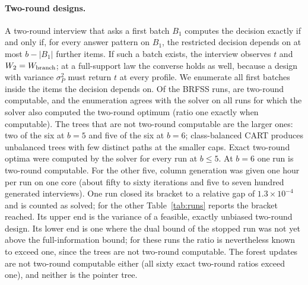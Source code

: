 \paragraph{Two-round designs.}
A two-round interview that asks a first batch $B_1$ computes the decision exactly if and only if, for every answer pattern on $B_1$, the restricted decision depends on at most $b-|B_1|$ further items. If such a batch exists, the interview observes $t$ and $W_2=W_{\rm branch}$; at a full-support law the converse holds as well, because a design with variance $\sigma_P^2$ must return $t$ at every profile. We enumerate all first batches inside the items the decision depends on. Of the \nBrfssRuns{} BRFSS runs, \nCompBrfss{} are two-round computable, and the enumeration agrees with the solver on all \nCompAgree{} runs for which the solver also computed the two-round optimum (ratio one exactly when computable). The trees that are not two-round computable are the larger ones: two of the six at $b=5$ and five of the six at $b=6$; class-balanced CART produces unbalanced trees with few distinct paths at the smaller caps. Exact two-round optima were computed by the solver for every run at $b\le5$. At $b=6$ one run is two-round computable. For the other five, column generation was given one hour per run on one core (about fifty to sixty iterations and five to seven hundred generated interviews). One run closed its bracket to a relative gap of $1.3\times10^{-4}$ and is counted as solved; for the other \nTwoBounded{} Table~\ref{tab:runs} reports the bracket reached. Its upper end is the variance of a feasible, exactly unbiased two-round design. Its lower end is one where the dual bound of the stopped run was not yet above the full-information bound; for these runs the ratio is nevertheless known to exceed one, since the trees are not two-round computable. The forest updates are not two-round computable either (all sixty exact two-round ratios exceed one), and neither is the pointer tree.

